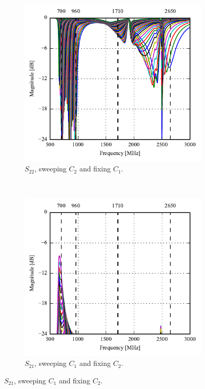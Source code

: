 \begin{figure}[htbp]
\begin{subfigure}[b]{0.49\linewidth}
        \includegraphics{img/tech_sol/monopole/highband/sim/s22.pdf}
        \caption{$S_{22}$, sweeping $C_2$ and fixing $C_1$.}
    \end{subfigure}
~
    \begin{subfigure}[b]{0.49\linewidth}
        \centering
        \includegraphics{img/tech_sol/monopole/highband/sim/s11_s21.pdf}
        \caption{$S_{21}$, sweeping $C_1$ and fixing $C_2$.}

\end{subfigure}
\end{figure}
